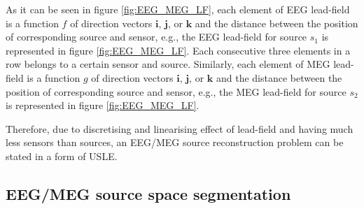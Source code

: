 As it can be seen in figure \ref{fig:EEG_MEG_LF},  each element of EEG lead-field is a function $f$ of direction vectors $\boldsymbol{i}$, $\boldsymbol{j}$, or $\boldsymbol{k}$ and the distance between the position of corresponding source and sensor, e.g., the EEG lead-field for source $s_1$ is represented in figure \ref{fig:EEG_MEG_LF}.
Each consecutive three elements in a row belongs to a certain sensor and source.
Similarly, %
 each element of MEG lead-field is a function $g$ of direction vectors $\boldsymbol{i}$, $\boldsymbol{j}$, or $\boldsymbol{k}$ and the distance between the position of corresponding source and sensor, e.g., the MEG lead-field for source $s_2$ is represented in figure \ref{fig:EEG_MEG_LF}.

Therefore, due to discretising and linearising effect of lead-field and having much less sensors than sources, an EEG/MEG source reconstruction problem can be stated in a form of USLE.
\newpage

\FloatBarrier
\newpage
\subsection{EEG/MEG source space segmentation} %
\label{sec:EMEG segmentation} 
